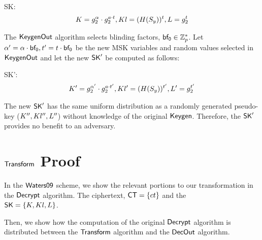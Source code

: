 \documentclass[11pt]{article}
\begin{document}
\begin{description}
\item {\sf SK}: \begin{multline*}  K = g_2^{\alpha} \cdot g_2^{a \cdot t},Kl = (H(S_y))^{t},L = g_2^{t} \end{multline*}
\end{description}

\noindent
The $\mathsf{KeygenOut}$ algorithm selects blinding factors, ${\sf bf_0} \in \mathbb{Z}_p^*$. Let $\alpha' = {\alpha \cdot {\sf bf_0}},t' = {t \cdot {\sf bf_0}}$ be the new MSK variables and random values selected in $\mathsf{KeygenOut}$ and let the new $\mathsf{SK}'$ be computed as follows:

\begin{description}
\item {\sf SK'}: \begin{multline*}  K' = g_2^{\alpha'} \cdot g_2^{a \cdot t'},Kl' = (H(S_y))^{t'},L' = g_2^{t'} \end{multline*}
\end{description}

\noindent
The new $\mathsf{SK}'$ has the same uniform distribution as a randomly generated pseudo-key ($K'',Kl'',L''$) without knowledge of the original $\mathsf{Keygen}$. Therefore, the $\mathsf{SK}'$ provides no benefit to an adversary.

\section{$\mathsf{Transform}$ Proof}

In the ${{\sf Waters09}}$ scheme, we show the relevant portions to our transformation in the $\mathsf{Decrypt}$ algorithm. The ciphertext, $\mathsf{CT} = \{ct\}$ and the \\ $\mathsf{SK} = \{K,Kl,L\}$. 

\gutsofdecrypt

Then, we show how the computation of the original $\mathsf{Decrypt}$ algorithm is distributed between the $\mathsf{Transform}$ algorithm and the $\mathsf{DecOut}$ algorithm.

\gutsoftransform
\end{document}
